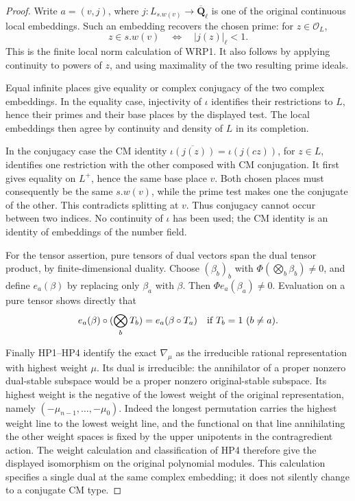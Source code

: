 \begin{proof}
Write \(a=(v,j)\), where \(j:L_{s.w(v)}\to
\overline{\mathbf Q}_\ell\) is one of the original continuous
local embeddings.  Such an embedding recovers the chosen prime:
for \(z\in\mathcal O_L\),
\[
                z\in s.w(v)
                   \quad\Longleftrightarrow\quad |j(z)|_\ell<1.
\]
This is the finite local norm calculation of WRP1.  It also follows
by applying continuity to powers of \(z\), and using maximality
of the two resulting prime ideals.

Equal infinite places give equality or complex conjugacy of the
two complex embeddings.  In the equality case, injectivity of
\(\iota\) identifies their restrictions to \(L\), hence their
primes and their base places by the displayed test.  The local
embeddings then agree by continuity and density of \(L\) in its
completion.

In the conjugacy case the CM identity
\(\overline{\iota(j(z))}=\iota(j(cz))\), for \(z\in L\),
identifies one restriction with the other composed with CM
conjugation.  It first gives equality on \(L^+\), hence the same
base place \(v\).  Both chosen places must consequently be the
same \(s.w(v)\), while the prime test makes one the conjugate of
the other.  This contradicts splitting at \(v\).  Thus conjugacy
cannot occur between two indices.  No continuity of \(\iota\)
has been used; the CM identity is an identity of embeddings of
the number field.

For the tensor assertion, pure tensors of dual vectors span the
dual tensor product, by finite-dimensional duality.  Choose
\((\beta_b)_b\) with
\(\Phi(\bigotimes_b\beta_b)\ne0\), and define \(e_a(\beta)\)
by replacing only \(\beta_a\) with \(\beta\).
Then \(\Phi e_a(\beta_a)\ne0\).  Evaluation on a pure tensor
shows directly that
\[
 e_a(\beta)\circ(\bigotimes_b T_b)
          =e_a(\beta\circ T_a)
                       \quad\hbox{if }T_b=1\ (b\ne a).
\]

Finally HP1--HP4 identify the exact \(\nabla_\mu\) as the
irreducible rational representation with highest weight \(\mu\).
Its dual is irreducible: the annihilator of a proper nonzero
dual-stable subspace would be a proper nonzero original-stable
subspace.  Its highest weight is the negative of the lowest
weight of the original representation, namely
\((-\mu_{n-1},\ldots,-\mu_0)\).
Indeed the longest permutation carries the highest weight line
to the lowest weight line, and the functional on that line
annihilating the other weight spaces is fixed by the upper
unipotents in the contragredient action.  The weight calculation
and classification of HP4 therefore give the displayed
isomorphism on the original polynomial modules.  This calculation
specifies a single dual at the same complex embedding; it does
not silently change to a conjugate CM type.
\end{proof}

